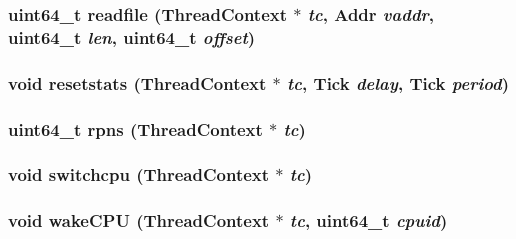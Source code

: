 \label{namespacePseudoInst_a89bd6a436c203e630bc715feab90fe13}
\hypertarget{namespacePseudoInst_a8dff656222f96d2cba431e2486c19ff1}{
\subsubsection[{readfile}]{\setlength{\rightskip}{0pt plus 5cm}uint64\_\-t readfile ({\bf ThreadContext} $\ast$ {\em tc}, \/  {\bf Addr} {\em vaddr}, \/  uint64\_\-t {\em len}, \/  uint64\_\-t {\em offset})}}
\label{namespacePseudoInst_a8dff656222f96d2cba431e2486c19ff1}
\hypertarget{namespacePseudoInst_ac534c5c76b19579243916a2ab19064af}{
\subsubsection[{resetstats}]{\setlength{\rightskip}{0pt plus 5cm}void resetstats ({\bf ThreadContext} $\ast$ {\em tc}, \/  {\bf Tick} {\em delay}, \/  {\bf Tick} {\em period})}}
\label{namespacePseudoInst_ac534c5c76b19579243916a2ab19064af}
\hypertarget{namespacePseudoInst_a80a5aaed64e395721c05798e013e3eba}{
\subsubsection[{rpns}]{\setlength{\rightskip}{0pt plus 5cm}uint64\_\-t rpns ({\bf ThreadContext} $\ast$ {\em tc})}}
\label{namespacePseudoInst_a80a5aaed64e395721c05798e013e3eba}
\hypertarget{namespacePseudoInst_aaf5643633dadf53cc203e80bd0b54ba6}{
\subsubsection[{switchcpu}]{\setlength{\rightskip}{0pt plus 5cm}void switchcpu ({\bf ThreadContext} $\ast$ {\em tc})}}
\label{namespacePseudoInst_aaf5643633dadf53cc203e80bd0b54ba6}
\hypertarget{namespacePseudoInst_a09f94700f81d851f029c37019d7dde05}{
\subsubsection[{wakeCPU}]{\setlength{\rightskip}{0pt plus 5cm}void wakeCPU ({\bf ThreadContext} $\ast$ {\em tc}, \/  uint64\_\-t {\em cpuid})}}
